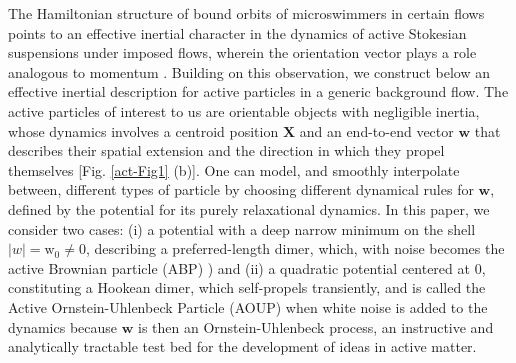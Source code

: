 \documentclass[../Rajarshi-thesis-draft.tex]{subfiles}
\begin{document}
The Hamiltonian structure of bound orbits of microswimmers in certain flows \cite{Stark2016, Lushi2015, Shelley2019, Arguedas_Leiva_2020} points to an effective inertial character in the dynamics of active Stokesian suspensions under imposed flows, wherein the orientation vector plays a role analogous to momentum \cite{Chajwa2019, Ronojoy2020, Chajwa2020}. Building on this observation, we construct below an effective inertial description for active particles in a generic background flow. The active particles of interest to us are orientable objects with negligible inertia, whose dynamics involves a centroid position $\mathbf{X}$ and an end-to-end vector $\mathbf{w}$ that describes their spatial extension and the direction in which they propel themselves [Fig. \ref{act-Fig1} (b)]. One can model, and smoothly interpolate between, different types of particle by choosing different dynamical rules for $\mathbf{w}$, defined by the potential for its purely relaxational dynamics. In this paper, we consider two cases: (i) a potential with a deep narrow minimum on the shell $|w| = \mathrm{w}_0 \neq 0$, describing a preferred-length dimer, which, with noise becomes the active Brownian particle (ABP) \cite{Romanczuk2012}) and (ii) a quadratic potential centered at 0, constituting a Hookean dimer, which self-propels transiently, and is called the Active Ornstein-Uhlenbeck Particle (AOUP) \cite{Howfar2016, Bonilla2019} when white noise is added to the dynamics because $\mathbf{w}$ is then an Ornstein-Uhlenbeck process, an instructive and analytically tractable test bed for the development of ideas in active matter.
\end{document}
